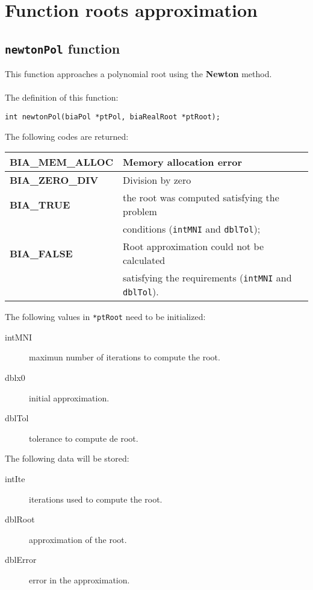 \FloatBarrier

\section{Function roots approximation}

\subsection{\texttt{newtonPol} function}

This function approaches a polynomial root using the \textbf{Newton} method.\\ \\
%
The definition of this function:
%
\begin{verbatim}
int newtonPol(biaPol *ptPol, biaRealRoot *ptRoot);  
\end{verbatim}
%
The following codes are returned:
%
\begin{center}
\begin{tabular}{|l|l|}
\hline
\textbf{BIA\_MEM\_ALLOC} & Memory allocation error \\
\hline
\textbf{BIA\_ZERO\_DIV} & Division by zero \\
\hline
\textbf{BIA\_TRUE} & the root was computed satisfying the problem \\
                   & conditions (\texttt{intMNI} and \texttt{dblTol}); \\
\hline
\textbf{BIA\_FALSE} & Root approximation could not be calculated \\
                    & satisfying the requirements (\texttt{intMNI} and \texttt{dblTol}). \\
\hline
\end{tabular}
\end{center}
%
The following values in \texttt{*ptRoot} need to be initialized:
%
\begin{description}
\item[intMNI] maximun number of iterations to compute the root.
\item[dblx0] initial approximation.
\item[dblTol] tolerance to compute de root.
\end{description}
%
The following data will be stored:
%
\begin{description}
\item[intIte] iterations used to compute the root.
\item[dblRoot] approximation of the root.
\item[dblError] error in the approximation.
\end{description}
%
%

